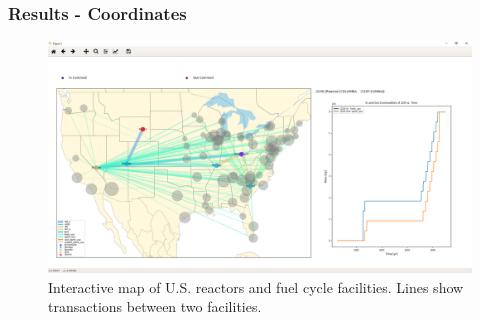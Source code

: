 \begin{frame}
    \frametitle{Results - Coordinates}
    \begin{figure}[htbp!]
        \begin{center}
                \includegraphics[width=.8\textwidth]{./images/sim_output/us/map.png}
        \end{center}
    \caption{Interactive map of U.S. reactors and fuel cycle
     facilities. Lines show transactions between two facilities.}
    \end{figure}
\end{frame}

